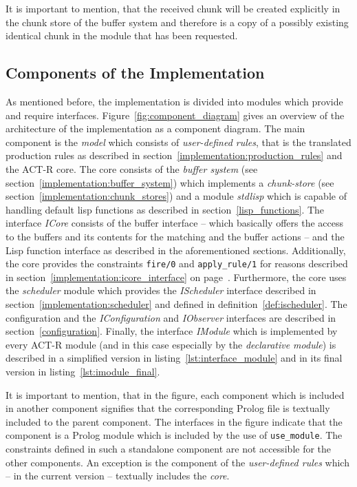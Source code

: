 It is important to mention, that the received chunk will be created explicitly in the chunk store of the buffer system and therefore is a copy of a possibly existing identical chunk in the module that has been requested.

\subsection{Components of the Implementation}
\label{implementation:components}

As mentioned before, the implementation is divided into modules which provide and require interfaces. Figure~\ref{fig:component_diagram} gives an overview of the architecture of the implementation as a component diagram. The main component is the \emph{model} which consists of \emph{user-defined rules}, that is the translated production rules as described in section~\ref{implementation:production_rules} and the ACT-R core. The core consists of the \emph{buffer system} (see section~\ref{implementation:buffer_system}) which implements a \emph{chunk-store} (see section~\ref{implementation:chunk_stores}) and a module \emph{stdlisp} which is capable of handling default lisp functions as described in section~\ref{lisp_functions}. The interface \emph{ICore} consists of the buffer interface -- which basically offers the access to the buffers and its contents for the matching and the buffer actions -- and the Lisp function interface as described in the aforementioned sections. Additionally, the core provides the constraints \lstinline|fire/0| and \lstinline|apply_rule/1| for reasons described in section~\ref{implementation:icore_interface} on page~\pageref{implementation:icore_interface}. Furthermore, the core uses the \emph{scheduler} module which provides the \emph{IScheduler} interface described in section~\ref{implementation:scheduler} and defined in definition~\ref{def:ischeduler}. The configuration and the \emph{IConfiguration} and \emph{IObserver} interfaces are described in section~\ref{configuration}. Finally, the interface \emph{IModule} which is implemented by every ACT-R module (and in this case especially by the \emph{declarative module}) is described in a simplified version in listing~\ref{lst:interface_module} and in its final version in listing~\ref{lst:imodule_final}.

It is important to mention, that in the figure, each component which is included in another component signifies that the corresponding Prolog file is textually included to the parent component. The interfaces in the figure indicate that the component is a Prolog module which is included by the use of \lstinline|use_module|. The constraints defined in such a standalone component are not accessible for the other components. An exception is the component of the \emph{user-defined rules} which -- in the current version -- textually includes the \emph{core}.

